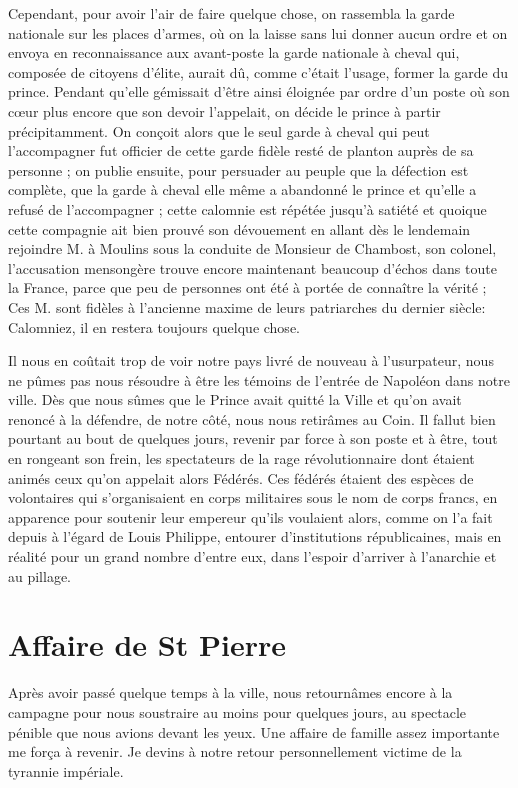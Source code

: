 \documentclass[11pt,a4paper]{report}
\begin{document}
Cependant, pour avoir l'air de faire quelque chose, on rassembla la garde nationale sur les places d'armes, où on la laisse sans lui donner aucun ordre et on envoya en reconnaissance aux avant-poste la garde nationale à cheval qui, composée de citoyens d'élite, aurait dû, comme c'était l'usage, former la garde du prince. Pendant qu'elle gémissait d'être ainsi éloignée par ordre d'un poste où son cœur plus encore que son devoir l'appelait, on décide le prince à partir précipitamment. On conçoit alors que le seul garde à cheval qui peut l'accompagner fut officier de cette garde fidèle resté de planton auprès de sa personne ; on publie ensuite, pour persuader au peuple que la défection est complète, que la garde à cheval elle même a abandonné le prince et qu'elle a refusé de l'accompagner ; cette calomnie est répétée jusqu'à satiété et quoique cette compagnie ait bien prouvé son dévouement en allant dès le lendemain rejoindre M. à Moulins sous la conduite de Monsieur de Chambost, son colonel, l'accusation mensongère trouve encore maintenant beaucoup d'échos dans toute la France, parce que peu de personnes ont été à portée de connaître la vérité ; Ces M. sont fidèles à l'ancienne maxime de leurs patriarches du dernier siècle: Calomniez, il en restera toujours quelque chose.

Il nous en coûtait trop de voir notre pays livré de nouveau à l'usurpateur, nous ne pûmes pas nous résoudre à être les témoins de l'entrée de Napoléon dans notre ville. Dès que nous sûmes que le Prince avait quitté la Ville et qu'on avait renoncé à la défendre, de notre côté, nous nous retirâmes au Coin. Il fallut bien pourtant au bout de quelques jours, revenir par force à son poste et à être, tout en rongeant son frein, les spectateurs de la rage révolutionnaire dont étaient animés ceux qu'on appelait alors Fédérés. Ces fédérés étaient des espèces de volontaires qui s'organisaient en corps militaires sous le nom de corps francs, en apparence pour soutenir leur empereur qu'ils voulaient alors, comme on l'a fait depuis à l'égard de Louis Philippe, entourer d'institutions républicaines, mais en réalité pour un grand nombre d'entre eux, dans l'espoir d'arriver à l'anarchie et au pillage.

\section*{Affaire de St Pierre}

Après avoir passé quelque temps à la ville, nous retournâmes encore à la campagne pour nous soustraire au moins pour quelques jours, au spectacle pénible que nous avions devant les yeux. Une affaire de famille assez importante me força à revenir. Je devins à notre retour personnellement victime de la tyrannie impériale.
\end{document}
